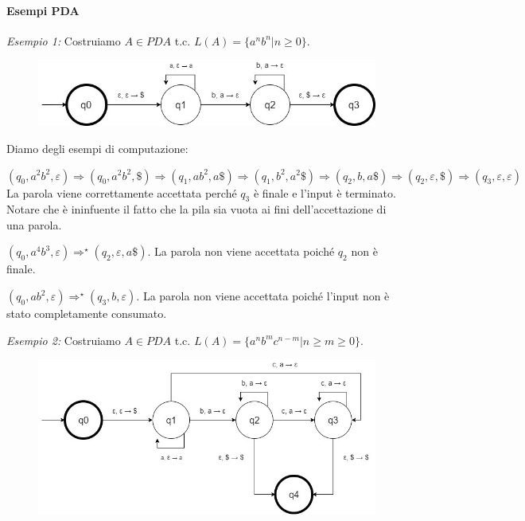 \paragraph{Esempi PDA}
\begin{description}
	\item \textit{Esempio 1:} Costruiamo $A \in PDA$ t.c. $L(A) =\{ a^nb^n | n \geq 0\}$.
	\begin{figure}[H]
	\includegraphics[scale=0.5]{p1}
	\end{figure}
	Diamo degli esempi di computazione:
	\begin{description}
		\item $(q_0, a^2b^2, \varepsilon) \Rightarrow (q_0, a^2b^2, \$) \Rightarrow (q_1, ab^2, a\$) \Rightarrow (q_1, b^2, a^2\$) \Rightarrow (q_2, b, a\$) \Rightarrow (q_2, \varepsilon, \$) \Rightarrow (q_3, \varepsilon, \varepsilon)$ \newline
	La parola viene correttamente accettata perché $q_3$ è finale e l'input è terminato. Notare che è ininfuente il fatto che la pila sia vuota ai fini dell'accettazione di una parola.
		\item $(q_0, a^4b^3, \varepsilon) \Rightarrow^{\star} (q_2, \varepsilon, a\$)$. La parola non viene accettata poiché $q_2$ non è finale.
		\item $(q_0, ab^2, \varepsilon) \Rightarrow^{\star} (q_3, b, \varepsilon)$. La parola non viene accettata poiché l'input non è stato completamente consumato.
	\end{description}
	\item \textit{Esempio 2:} Costruiamo $A \in PDA$ t.c. $L(A) =\{ a^nb^mc^{n-m} | n \geq m \geq 0\}$.
	\begin{figure}[H]
	\includegraphics[scale=0.5]{p2}

\end{figure}
\end{description}
